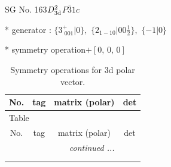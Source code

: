 \documentclass[fleqn,8pt]{jsarticle}
\begin{document}
\setcounter{MaxMatrixCols}{32}

\renewcommand{\tablename}{Table~}
\renewcommand{\figurename}{Figure~}
\begin{center}
\LARGE
SG No. 163\quad$D_{\rm 3d}^{2}$\quad$P\bar{3}1c$\quad[ trigonal ]
\end{center}

* generator : $\{3^{+}_{\,\,001}|0\},\,\,\{2{}_{1-10}|0 0 \frac{1}{2}\},\,\,\{-1|0\}$

* symmetry operation\quad$+\left[ 0,\, 0,\, 0 \right]$
\renewcommand{\arraystretch}{1.3}
\begin{longtable}{cccc}
\caption{Symmetry operations for 3d polar vector.}
 \\
 \hline \hline
No. & tag & matrix (polar) & det \\ \hline \endfirsthead

\multicolumn{3}{l}{\tablename\ \thetable{}} \\
 \hline \hline
No. & tag & matrix (polar) & det \\ \hline \endhead

 \hline \hline
\multicolumn{3}{r}{\footnotesize\it continued ...} \\ \endfoot

 \hline \hline
\multicolumn{3}{r}{} \\ \endlastfoot


\end{longtable}
\end{document}
